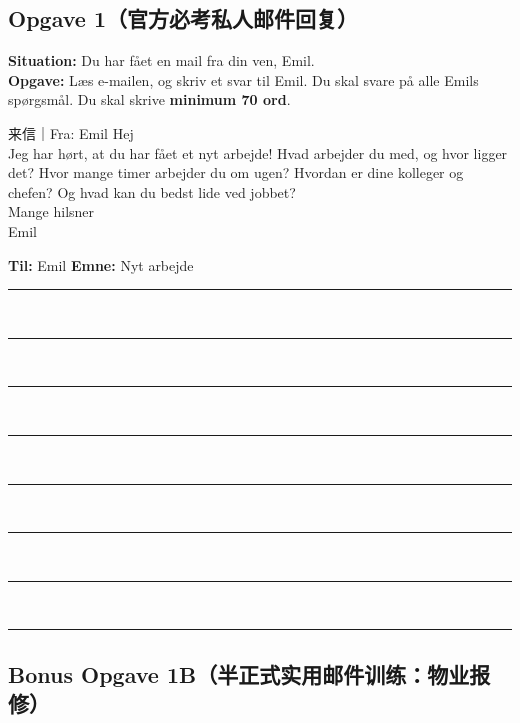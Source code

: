 
\subsection*{Opgave 1（官方必考私人邮件回复）}

\textbf{Situation:} Du har fået en mail fra din ven, Emil.\\
\textbf{Opgave:} Læs e-mailen, og skriv et svar til Emil. Du skal svare på alle Emils spørgsmål. Du skal skrive \textbf{minimum 70 ord}.

\begin{emailbox}{来信｜Fra: Emil}
Hej\\
Jeg har hørt, at du har fået et nyt arbejde! Hvad arbejder du med, og hvor ligger det? Hvor mange timer arbejder du om ugen? Hvordan er dine kolleger og chefen? Og hvad kan du bedst lide ved jobbet?\\[4pt]
Mange hilsner\\
Emil
\end{emailbox}

\begin{tcolorbox}[enhanced, colback=white, colframe=NCDGray, arc=2pt, boxrule=0.8pt, left=10pt, right=10pt, top=7pt, bottom=7pt]
\textbf{Til:} Emil \qquad\qquad \textbf{Emne:} Nyt arbejde\\[6pt]
\rule{\linewidth}{0.4pt}\\[9pt]
\rule{\linewidth}{0.4pt}\\[9pt]
\rule{\linewidth}{0.4pt}\\[9pt]
\rule{\linewidth}{0.4pt}\\[9pt]
\rule{\linewidth}{0.4pt}\\[9pt]
\rule{\linewidth}{0.4pt}\\[9pt]
\rule{\linewidth}{0.4pt}\\[9pt]
\rule{\linewidth}{0.4pt}
\end{tcolorbox}

\subsection*{Bonus Opgave 1B（半正式实用邮件训练：物业报修）}

